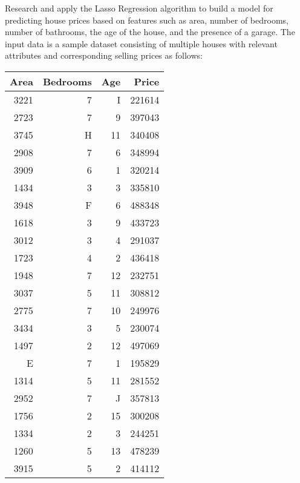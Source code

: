 \documentclass[12pt, a4paper]{report}
\begin{document}
Research and apply the Lasso Regression algorithm to build a model for predicting house prices based on features such as area, number of bedrooms, number of bathrooms, the age of the house, and the presence of a garage. The input data is a sample dataset consisting of multiple houses with relevant attributes and corresponding selling prices as follows:
\begin{table}[h!]
    \centering
    \begin{tabular}{|r|r|r|r|}
\hline
\textbf{Area} & \textbf{Bedrooms} & \textbf{Age} & \textbf{Price} \\
\hline
3221 & 7 & I & 221614 \\
2723 & 7 & 9 & 397043 \\
3745 & H & 11 & 340408 \\
2908 & 7 & 6 & 348994 \\
3909 & 6 & 1 & 320214 \\
1434 & 3 & 3 & 335810 \\
3948 & F & 6 & 488348 \\
1618 & 3 & 9 & 433723 \\
3012 & 3 & 4 & 291037 \\
1723 & 4 & 2 & 436418 \\
1948 & 7 & 12 & 232751 \\
3037 & 5 & 11 & 308812 \\
2775 & 7 & 10 & 249976 \\
3434 & 3 & 5 & 230074 \\
1497 & 2 & 12 & 497069 \\
E & 7 & 1 & 195829 \\
1314 & 5 & 11 & 281552 \\
2952 & 7 & J & 357813 \\
1756 & 2 & 15 & 300208 \\
1334 & 2 & 3 & 244251 \\
1260 & 5 & 13 & 478239 \\
3915 & 5 & 2 & 414112 \\
\hline
\end{tabular}
\end{table}
\newpage
\end{document}
